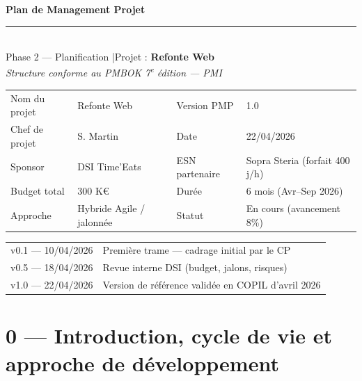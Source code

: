 \documentclass[11pt,a4paper,oneside]{report}
\begin{document}
\small

\begin{center}
{\LARGE\bfseries\color{cnNavy} Plan de Management Projet}\\[4pt]
\textcolor{cnOrange}{\rule{10cm}{1pt}}\\[4pt]
{\large\color{cnSlate} Phase 2 — Planification \quad|\quad Projet : \textbf{Refonte Web}}\\[2pt]
{\footnotesize\color{cnSlate}\textit{Structure conforme au PMBOK 7\textsuperscript{e} édition — PMI}}
\end{center}

\vspace{4pt}
\renewcommand{\arraystretch}{1.4}
\begin{tabularx}{\textwidth}{L{3.5cm} Y L{3.5cm} Y}
\toprule
{} &  &  &  \\
\midrule
Nom du projet   & Refonte Web            & Version PMP    & 1.0 \\
Chef de projet  & S. Martin              & Date           & 22/04/2026 \\
Sponsor         & DSI Time'Eats          & ESN partenaire & Sopra Steria (forfait 400 j/h) \\
Budget total    & 300 K€                 & Durée          & 6 mois (Avr–Sep 2026) \\
Approche        & Hybride Agile / jalonnée & Statut       & En cours (avancement 8\%) \\
\bottomrule
\end{tabularx}

\vspace{4pt}
\renewcommand{\arraystretch}{1.3}
\begin{tabularx}{\textwidth}{L{2.5cm} Y}
\toprule
{} & \th{} \\
\midrule
v0.1 — 10/04/2026  & Première trame — cadrage initial par le CP \\
v0.5 — 18/04/2026  & Revue interne DSI (budget, jalons, risques) \\
v1.0 — 22/04/2026  & Version de référence validée en COPIL d'avril 2026 \\
\bottomrule
\end{tabularx}

\section*{0 — Introduction, cycle de vie et approche de développement}
\end{document}
